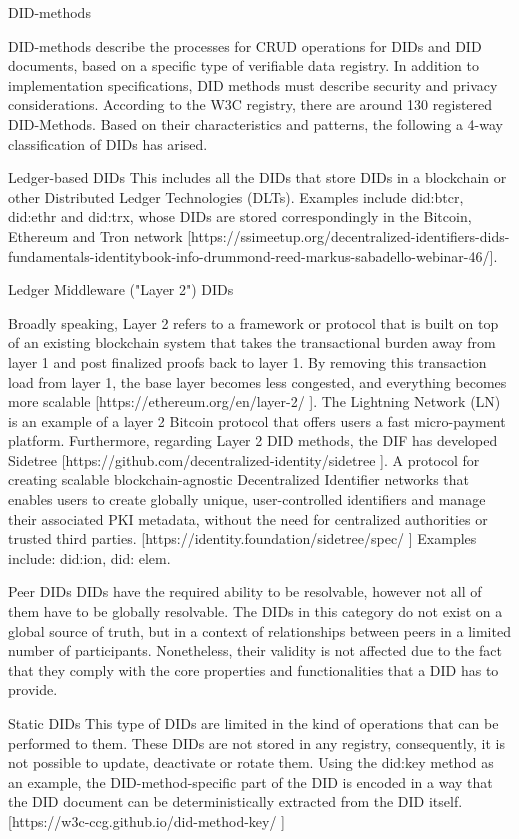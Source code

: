 DID-methods

DID-methods describe the processes for CRUD operations for DIDs and DID documents, based on a specific type of verifiable data registry. In addition to implementation specifications, DID methods must describe security and privacy considerations.
According to the W3C registry, there are around 130 registered DID-Methods. Based on their characteristics and patterns, the following a 4-way classification of DIDs has arised.

Ledger-based DIDs
This includes all the DIDs that store DIDs in a blockchain or other Distributed Ledger Technologies (DLTs). Examples include did:btcr, did:ethr and did:trx, whose DIDs are stored correspondingly in the Bitcoin, Ethereum and Tron network [https://ssimeetup.org/decentralized-identifiers-dids-fundamentals-identitybook-info-drummond-reed-markus-sabadello-webinar-46/].

Ledger Middleware ("Layer 2") DIDs

Broadly speaking, Layer 2 refers to a framework or protocol that is built on top of an existing blockchain system that takes the transactional burden away from layer 1 and post finalized proofs back to layer 1. By removing this transaction load from layer 1, the base layer becomes less congested, and everything becomes more scalable [https://ethereum.org/en/layer-2/ ]. The Lightning Network (LN) is an example of a layer 2 Bitcoin protocol that offers users a fast micro-payment platform. Furthermore, regarding Layer 2 DID methods, the DIF has developed Sidetree [https://github.com/decentralized-identity/sidetree ]. A protocol for creating scalable blockchain-agnostic Decentralized Identifier networks that enables users to create globally unique, user-controlled identifiers and manage their associated PKI metadata, without the need for centralized authorities or trusted third parties.  [https://identity.foundation/sidetree/spec/ ]
Examples include: did:ion, did: elem. 

Peer DIDs
DIDs have the required ability to be resolvable, however not all of them have to be globally resolvable. The DIDs in this category do not exist on a global source of truth, but in a context of  relationships between peers in a limited number of participants. Nonetheless, their validity is not affected due to the fact that they comply with the core properties and functionalities that a DID has to provide. 



Static DIDs
This type of DIDs are limited in the kind of operations that can be performed to them. These DIDs are not stored in any registry, consequently, it is not possible to update, deactivate or rotate them. Using the did:key method as an example, the DID-method-specific part of the DID is encoded in a way that the DID document can be deterministically extracted from the DID itself. [https://w3c-ccg.github.io/did-method-key/ ]


